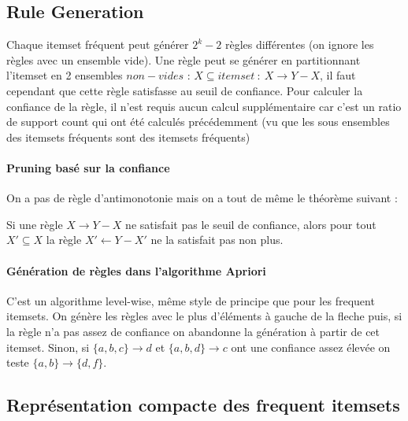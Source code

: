 \documentclass{article}
\begin{document}
\begin{sffamily}
\subsection{Rule Generation}

Chaque itemset fréquent peut générer $2^k-2$ règles différentes (on ignore les règles avec un ensemble vide). Une règle peut se générer en 
partitionnant l'itemset en 2 ensembles $non-vides$ : $X \subseteq itemset\ :\ X \rightarrow Y-X$, il faut cependant que cette règle 
satisfasse au seuil de confiance. Pour calculer la confiance de la règle, il n'est requis aucun calcul supplémentaire car c'est un ratio de 
support count qui ont été calculés précédemment (vu que les sous ensembles des itemsets fréquents sont des itemsets fréquents)
	
\paragraph{Pruning basé sur la confiance} On a pas de règle d'antimonotonie mais on a tout de même le théorème suivant : \\
\begin{center}
Si une règle $X\rightarrow Y-X$ ne satisfait pas le seuil de confiance, alors pour tout $X'\subseteq X$ la règle $X'\leftarrow Y-X'$ ne la 
satisfait pas non plus.
\end{center}

\paragraph{Génération de règles dans l'algorithme Apriori} C'est un algorithme level-wise, même style de principe que pour les frequent 
itemsets. On génère les règles avec le plus d'éléments à gauche de la fleche puis, si la règle n'a pas assez de confiance on abandonne la 
génération à partir de cet itemset. Sinon, si $\{a,b,c\} \rightarrow d$ et $\{a,b,d\} \rightarrow c$ ont une confiance assez élevée on 
teste $\{a,b\} \rightarrow \{d,f\}$.

\subsection{Représentation compacte des frequent itemsets}


\end{sffamily}
\end{document}
